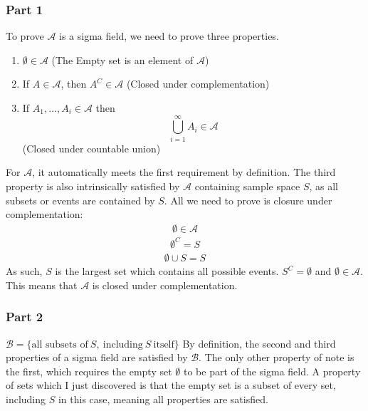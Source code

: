 \documentclass{article}
\begin{document}
\subsubsection*{Part 1}
To prove $\mathcal{A}$ is a sigma field, we need to prove three properties. 
\begin{enumerate}
    \item
      $\emptyset \in \mathcal{A}$ (The Empty set is an element of $\mathcal{A}$)
    \item
      If $A \in \mathcal{A}$, then $A^{C} \in \mathcal{A}$ (Closed under complementation)
    \item
    If $A_1,...,A_i \in \mathcal{A}$ then \[\bigcup_{i=1}^{\infty}A_i \in \mathcal{A}\] (Closed under countable union)
\end{enumerate}
	For $\mathcal{A}$, it automatically meets the first requirement by definition. The third property is also intrinsically satisfied by $\mathcal{A}$ containing sample space $S$, as all subsets or events are contained by $S$. All we need to prove is closure under complementation:
\begin{align*}
\emptyset \in \mathcal{A}
\end{align*}
\begin{align*}
\emptyset^{C} = S
\end{align*}
\begin{align*}
\emptyset \cup S = S
\end{align*}
As such, $S$ is the largest set which contains all possible events. $S^{C}=\emptyset$ and $\emptyset \in \mathcal{A}$. This means that $\mathcal{A}$ is closed under complementation.
\subsubsection*{Part 2}
$\mathcal{B} = \{\textrm{all subsets of}\ S,\  \textrm{including}\ S\  \textrm{itself}\}$
By definition, the second and third properties of a sigma field are satisfied by $\mathcal{B}$. The only other property of note is the first, which requires the empty set $\emptyset$ to be part of the sigma field. A property of sets which I just discovered is that the empty set is a subset of every set, including $S$ in this case, meaning all properties are satisfied.
\end{document}
